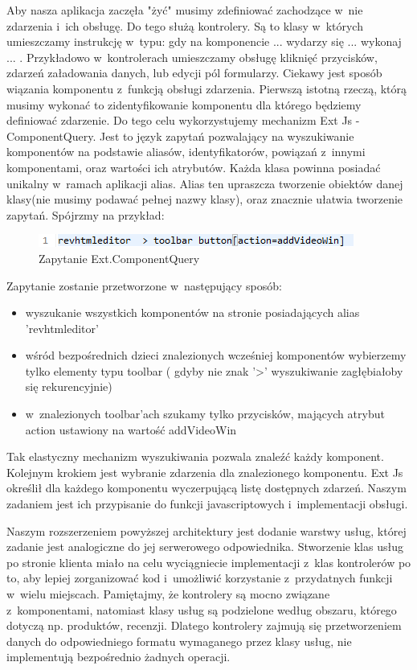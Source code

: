 Aby nasza aplikacja zaczęła "żyć" musimy zdefiniować zachodzące w~nie zdarzenia i~ich obsługę. Do tego służą kontrolery. Są to klasy w~których umieszczamy instrukcję w~typu: gdy na komponencie ... wydarzy się ... wykonaj ... . Przykładowo w~kontrolerach umieszczamy obsługę kliknięć przycisków, zdarzeń załadowania danych, lub edycji pól formularzy. Ciekawy jest sposób wiązania komponentu z~funkcją obsługi zdarzenia. Pierwszą istotną rzeczą, którą musimy wykonać to zidentyfikowanie komponentu dla którego będziemy definiować zdarzenie. Do tego celu wykorzystujemy mechanizm Ext Js - ComponentQuery. Jest to język zapytań pozwalający na wyszukiwanie komponentów na podstawie aliasów, identyfikatorów, powiązań z~innymi komponentami, oraz wartości ich atrybutów. Każda klasa powinna posiadać unikalny w~ramach aplikacji alias. Alias ten upraszcza tworzenie obiektów danej klasy(nie musimy podawać pełnej nazwy klasy), oraz znacznie ułatwia tworzenie zapytań. Spójrzmy na przykład: 

\begin{figure}[H]
	\centering
	\includegraphics[width=\textwidth]{images/cmp_query.png}
	\caption{Zapytanie Ext.ComponentQuery}
\end{figure}

Zapytanie zostanie przetworzone w~następujący sposób:

\begin{itemize}
\item wyszukanie wszystkich komponentów na stronie posiadających alias 'revhtmleditor'
\item wśród bezpośrednich dzieci znalezionych wcześniej komponentów wybierzemy tylko elementy typu toolbar ( gdyby nie znak '>' wyszukiwanie zagłębiałoby się rekurencyjnie)
\item w~znalezionych toolbar'ach szukamy tylko przycisków, mających atrybut action ustawiony na wartość addVideoWin
\end{itemize}

Tak elastyczny mechanizm wyszukiwania pozwala znaleźć każdy komponent.
Kolejnym krokiem jest wybranie zdarzenia dla znalezionego komponentu. Ext Js określił dla każdego komponentu wyczerpującą listę dostępnych zdarzeń. Naszym zadaniem jest ich przypisanie do funkcji javascriptowych i~implementacji obsługi.

Naszym rozszerzeniem powyższej architektury jest dodanie warstwy usług, której zadanie jest analogiczne do jej serwerowego odpowiednika. Stworzenie klas usług po stronie klienta miało na celu wyciągniecie implementacji z~klas kontrolerów po to, aby lepiej zorganizować kod i~umożliwić korzystanie z~przydatnych funkcji w~wielu miejscach. Pamiętajmy, że kontrolery są mocno związane z~komponentami, natomiast klasy usług są podzielone według obszaru, którego dotyczą np. produktów, recenzji. Dlatego kontrolery zajmują się przetworzeniem danych do odpowiedniego formatu wymaganego przez klasy usług, nie implementują bezpośrednio żadnych operacji.




